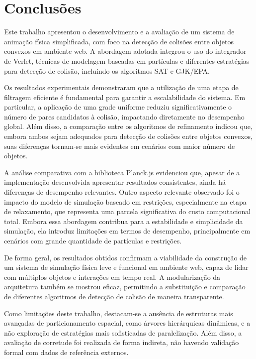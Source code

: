 \chapter{Conclusões}

Este trabalho apresentou o desenvolvimento e a avaliação de um sistema de animação física simplificada, com foco na detecção de colisões entre objetos convexos em ambiente web. A abordagem adotada integrou o uso do integrador de Verlet, técnicas de modelagem baseadas em partículas e diferentes estratégias para detecção de colisão, incluindo os algoritmos SAT e GJK/EPA.

Os resultados experimentais demonstraram que a utilização de uma etapa de filtragem eficiente é fundamental para garantir a escalabilidade do sistema. Em particular, a aplicação de uma grade uniforme reduziu significativamente o número de pares candidatos à colisão, impactando diretamente no desempenho global. Além disso, a comparação entre os algoritmos de refinamento indicou que, embora ambos sejam adequados para detecção de colisões entre objetos convexos, suas diferenças tornam-se mais evidentes em cenários com maior número de objetos.

A análise comparativa com a biblioteca Planck.js evidenciou que, apesar de a implementação desenvolvida apresentar resultados consistentes, ainda há diferenças de desempenho relevantes. Outro aspecto relevante observado foi o impacto do modelo de simulação baseado em restrições, especialmente na etapa de relaxamento, que representa uma parcela significativa do custo computacional total. Embora essa abordagem contribua para a estabilidade e simplicidade da simulação, ela introduz limitações em termos de desempenho, principalmente em cenários com grande quantidade de partículas e restrições.

De forma geral, os resultados obtidos confirmam a viabilidade da construção de um sistema de simulação física leve e funcional em ambiente web, capaz de lidar com múltiplos objetos e interações em tempo real. A modularização da arquitetura também se mostrou eficaz, permitindo a substituição e comparação de diferentes algoritmos de detecção de colisão de maneira transparente.

Como limitações deste trabalho, destacam-se a ausência de estruturas mais avançadas de particionamento espacial, como árvores hierárquicas dinâmicas, e a não exploração de estratégias mais sofisticadas de paralelização. Além disso, a avaliação de corretude foi realizada de forma indireta, não havendo validação formal com dados de referência externos.

